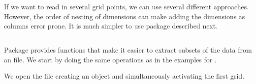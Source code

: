 \documentclass[krantz2]{krantz}\usepackage{knitr}
\begin{document}
If we want to read in several grid points, we can use several different approaches. However, the order of nesting of dimensions can make adding the dimensions as columns error prone. It is much simpler to use package  described next.

\subsection[tidync]{}



Package  provides functions that make it easier to extract subsets of the data from an  file. We start by doing the same operations as in the examples for .

We open the file creating an object and simultaneously activating the first grid.

\begin{knitrout}\footnotesize
{}\color{fgcolor}\begin{kframe}
\begin{alltt}
 \hlkwb{<-} \hlstd{(}\hlstd{)}
\end{alltt}


{\ttfamily\noindent\bfseries{}}\begin{alltt}
\end{alltt}


{\ttfamily\noindent\bfseries\color{errorcolor}{\#\# Error in eval(expr, envir, enclos): object 'meteo\_data.tnc' not found}}\end{kframe}
\end{knitrout}

\begin{knitrout}\footnotesize
{}\color{fgcolor}\begin{kframe}
\begin{alltt}
\end{alltt}


{\ttfamily\noindent\bfseries{}}\end{kframe}
\end{knitrout}
\end{document}
